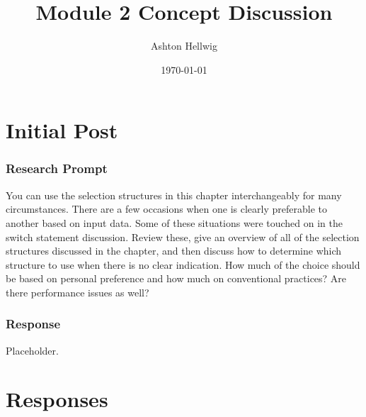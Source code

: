 \documentclass[12pt,parskip=half]{scrreprt}
\title{Module 2 Concept Discussion}
\author{Ashton Hellwig}
\date{\today}
\theoremstyle{definition}
\theoremstyle{plain}
\begin{document}
  \maketitle
  \tableofcontents
  \newpage


  \part{Initial Post}

    \section{Research Prompt}
      \begin{mdframed}[backgroundcolor=green!20]
        You can use the selection structures in this chapter interchangeably
          for many circumstances. There are a few occasions when one is clearly
          preferable to another based on input data. Some of these situations
          were touched on in the switch statement discussion. Review these, give
          an overview of all of the selection structures discussed in the
          chapter, and then discuss how to determine which structure to use when
          there is no clear indication. How much of the choice should be based
          on personal preference and how much on conventional practices? Are
          there performance issues as well?
      \end{mdframed}

    \section{Response}
      Placeholder.


  \newpage
  \part{Responses}





  \newpage
  \nocite{malik_2015}
  \printbibliography[
    heading=bibintoc,
    title={Bibliography}
  ]
\end{document}
